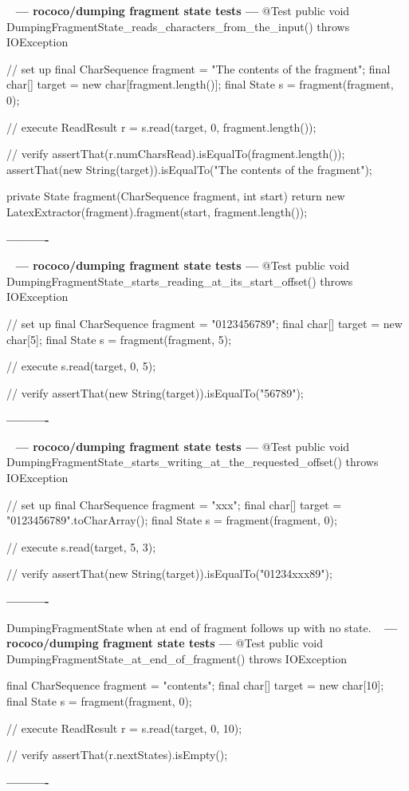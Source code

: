 \documentclass{book}
\newenvironment{chunk}[1]{%
{\ }\newline\noindent%
\hbox{\hskip 2.0cm}{\bf --- #1 ---}%
\verbatim}%                               say exactly what we see
{\endverbatim%
\par{}%
\noindent{}%
\hbox{\hskip 2.0cm}{\bf ----------}%
\par%
\normalsize\noindent}%
\begin{document}
\begin{chunk}{rococo/dumping fragment state tests}
@Test
public void DumpingFragmentState_reads_characters_from_the_input() throws IOException {
    // set up
    final CharSequence fragment = "The contents of the fragment";
    final char[] target = new char[fragment.length()];
    final State s = fragment(fragment, 0);

    // execute
    ReadResult r = s.read(target, 0, fragment.length());

    // verify
    assertThat(r.numCharsRead).isEqualTo(fragment.length());
    assertThat(new String(target)).isEqualTo("The contents of the fragment");
}

private State fragment(CharSequence fragment, int start) {
    return new LatexExtractor(fragment).fragment(start, fragment.length());
}
\end{chunk}

\begin{chunk}{rococo/dumping fragment state tests}
@Test
public void DumpingFragmentState_starts_reading_at_its_start_offset() throws IOException {
    // set up
    final CharSequence fragment = "0123456789";
    final char[] target = new char[5];
    final State s = fragment(fragment, 5);

    // execute
    s.read(target, 0, 5);

    // verify
    assertThat(new String(target)).isEqualTo("56789");
}
\end{chunk}

\begin{chunk}{rococo/dumping fragment state tests}
@Test
public void DumpingFragmentState_starts_writing_at_the_requested_offset() throws IOException {
    // set up
    final CharSequence fragment = "xxx";
    final char[] target = "0123456789".toCharArray();
    final State s = fragment(fragment, 0);

    // execute
    s.read(target, 5, 3);

    // verify
    assertThat(new String(target)).isEqualTo("01234xxx89");
}
\end{chunk}

DumpingFragmentState when at end of fragment follows up with no state.
\begin{chunk}{rococo/dumping fragment state tests}
@Test
public void DumpingFragmentState_at_end_of_fragment() throws IOException {
    final CharSequence fragment = "contents";
    final char[] target = new char[10];
    final State s = fragment(fragment, 0);

    // execute
    ReadResult r = s.read(target, 0, 10);

    // verify
    assertThat(r.nextStates).isEmpty();
}
\end{chunk}
\end{document}
